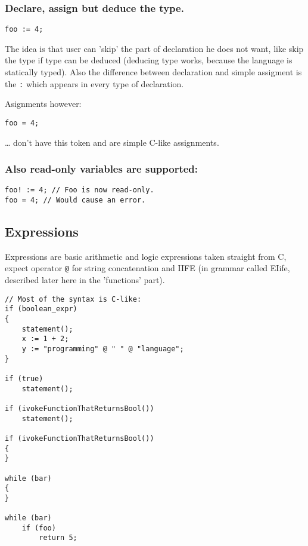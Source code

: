 \documentclass[11pt]{article}
\begin{document}
\subsubsection*{Declare, assign but deduce the type.}
\label{sec:org7f9d93d}
\begin{verbatim}
foo := 4;
\end{verbatim}

The idea is that user can 'skip' the part of declaration he does not want, like
skip the type if type can be deduced (deducing type works, because the language
is statically typed). Also the difference between declaration and simple
assigment is the \texttt{:} which appears in every type of declaration.

Asignments however:
\begin{verbatim}
foo = 4;
\end{verbatim}
\ldots{} don't have this token and are simple C-like assignments.

\subsubsection*{Also read-only variables are supported:}
\label{sec:orgcfddf84}
\begin{verbatim}
foo! := 4; // Foo is now read-only.
foo = 4; // Would cause an error.
\end{verbatim}


\subsection*{Expressions}
\label{sec:org0fbd163}

Expressions are basic arithmetic and logic expressions taken straight from C,
expect operator \texttt{@} for string concatenation and IIFE (in grammar
called EIife, described later here in the 'functions' part).

\begin{verbatim}
// Most of the syntax is C-like:
if (boolean_expr)
{
    statement();
    x := 1 + 2;
    y := "programming" @ " " @ "language";
}

if (true)
    statement();

if (ivokeFunctionThatReturnsBool())
    statement();

if (ivokeFunctionThatReturnsBool())
{
}

while (bar)
{
}

while (bar)
    if (foo)
        return 5;
\end{verbatim}
\end{document}
